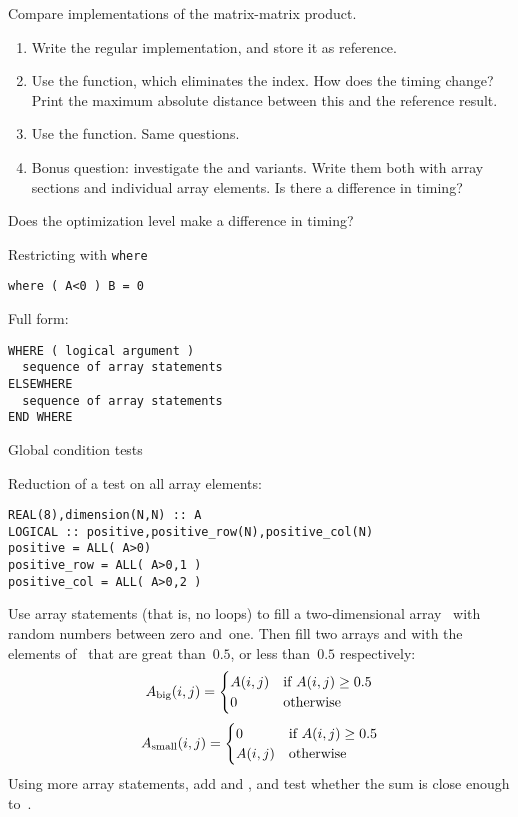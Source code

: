 \begin{exercise}
  \label{ex:fmatmul}
  Compare implementations of the matrix-matrix product.
  \begin{enumerate}
  \item Write the regular  implementation, and store it as
    reference.
  \item Use the  function, which eliminates the 
    index. How does the timing change? Print the maximum absolute
    distance between this and the reference result.
  \item Use the  function. Same questions.
  \item Bonus question: investigate the  and 
    variants. Write them both with array sections and individual array
    elements. Is there a difference in timing?
  \end{enumerate}
  Does the optimization level make a difference in timing?
\end{exercise}

 {Restricting with \tt{where}}

\begin{verbatim}
where ( A<0 ) B = 0
\end{verbatim}

Full form:
\begin{verbatim}
WHERE ( logical argument )
  sequence of array statements
ELSEWHERE
  sequence of array statements
END WHERE
\end{verbatim}

 {Global condition tests}

Reduction of a test on all array elements:
\begin{verbatim}
REAL(8),dimension(N,N) :: A
LOGICAL :: positive,positive_row(N),positive_col(N)
positive = ALL( A>0)
positive_row = ALL( A>0,1 )
positive_col = ALL( A>0,2 )
\end{verbatim}

\begin{exercise}
  Use array statements (that is, no loops) to fill a two-dimensional
  array~ with random numbers between zero and~one. Then fill two
  arrays  and  with the elements of~ that are
  great than~$0.5$, or less than~$0.5$ respectively:
  \[ A_{\scriptstyle\mathrm{big}}(i,j) =
  \begin{cases}
    A(i,j)&\hbox{if $A(i,j)\geq 0.5$}\\ 0&\hbox{otherwise}
  \end{cases}
  \]
  \[ A_{\scriptstyle\mathrm{small}}(i,j) =
  \begin{cases}
    0&\hbox{if $A(i,j)\geq 0.5$}\\ A(i,j)&\hbox{otherwise}
  \end{cases}
  \]
  Using more array statements, add  and , and test
  whether the sum is close enough to~.
\end{exercise}

